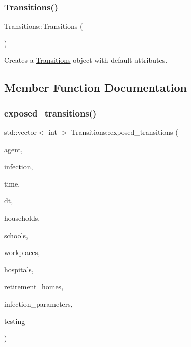 \subsubsection{\texorpdfstring{Transitions()}{Transitions()}}
{\footnotesize\ttfamily Transitions\+::\+Transitions (\begin{DoxyParamCaption}{ }\end{DoxyParamCaption})\hspace{0.3cm}{\ttfamily [default]}}



Creates a \hyperlink{classTransitions}{Transitions} object with default attributes. 



\subsection{Member Function Documentation}
\mbox{\label{classTransitions_a3dfcc686ebd4d77becae69ac993af380}} 
\subsubsection{\texorpdfstring{exposed\+\_\+transitions()}{exposed\_transitions()}}
{\footnotesize\ttfamily std\+::vector$<$ int $>$ Transitions\+::exposed\+\_\+transitions (\begin{DoxyParamCaption}\item[{\hyperlink{classAgent}{Agent} \&}]{agent,  }\item[{\hyperlink{classInfection}{Infection} \&}]{infection,  }\item[{const double}]{time,  }\item[{const double}]{dt,  }\item[{std\+::vector$<$ \hyperlink{classHousehold}{Household} $>$ \&}]{households,  }\item[{std\+::vector$<$ \hyperlink{classSchool}{School} $>$ \&}]{schools,  }\item[{std\+::vector$<$ \hyperlink{classWorkplace}{Workplace} $>$ \&}]{workplaces,  }\item[{std\+::vector$<$ \hyperlink{classHospital}{Hospital} $>$ \&}]{hospitals,  }\item[{std\+::vector$<$ \hyperlink{classRetirementHome}{Retirement\+Home} $>$ \&}]{retirement\+\_\+homes,  }\item[{const std\+::map$<$ std\+::string, double $>$ \&}]{infection\+\_\+parameters,  }\item[{const \hyperlink{classTesting}{Testing} \&}]{testing }\end{DoxyParamCaption})}



